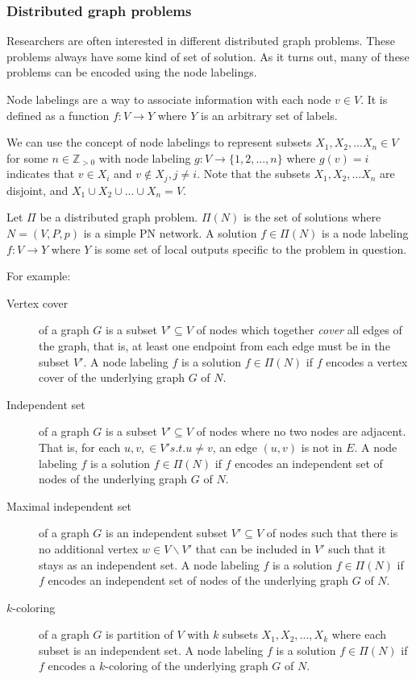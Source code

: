 \subsubsection{Distributed graph problems}
Researchers are often interested in different distributed graph problems.
These problems always have some kind of set of solution.
As it turns out, many of these problems can be encoded using the node labelings.

Node labelings are a way to associate information with each node $v \in V$.
It is defined as a function $f: V \rightarrow Y$ where $Y$ is an arbitrary set of labels.

We can use the concept of node labelings to represent subsets $X_1, X_2, ... X_n \in V$ for some $n \in \mathbb{Z}_{>0}$ with node labeling $g: V \rightarrow \{1, 2, ..., n\}$ where $g(v) = i$ indicates that $v \in X_i$ and $v \notin X_j, j \neq i$.
Note that the subsets $X_1, X_2, ... X_n$  are disjoint, and $X_1 \cup X_2 \cup ... \cup X_n = V$.

Let $\Pi$ be a distributed graph problem.
$\Pi(N)$ is the set of solutions where $N=(V, P, p)$ is a simple PN network.
A solution $f \in \Pi(N)$ is a node labeling $f: V \rightarrow Y$ where $Y$ is some set of local outputs specific to the problem in question.

For example:
\begin{description}
  \item[Vertex cover] of a graph $G$ is a subset $V' \subseteq V$ of nodes which together \emph{cover} all edges of the graph, that is, at least one endpoint from each edge must be in the subset $V'$.
  A node labeling $f$ is a solution $f \in \Pi(N)$ if $f$ encodes a vertex cover of the underlying graph $G$ of $N$.
  \item[Independent set] of a graph $G$ is a subset $V' \subseteq V$ of nodes where no two nodes are adjacent. That is, for each $u, v, \in V' s.t. u \neq v$, an edge $(u, v)$ is not in $E$.
  A node labeling $f$ is a solution $f \in \Pi(N)$ if $f$ encodes an independent set of nodes of the underlying graph $G$ of $N$.
  \item[Maximal independent set] of a graph $G$ is an independent subset $V' \subseteq V$ of nodes such that there is no additional vertex $w \in V \backslash V'$ that can be included in $V'$ such that it stays as an independent set.
  A node labeling $f$ is a solution $f \in \Pi(N)$ if $f$ encodes an independent set of nodes of the underlying graph $G$ of $N$.
  \item[$k$-coloring] of a graph $G$ is partition of $V$ with $k$ subsets $X_1, X_2, ..., X_k$ where each subset is an independent set.
  A node labeling $f$ is a solution $f \in \Pi(N)$ if $f$ encodes a $k$-coloring of the underlying graph $G$ of $N$.
\end{description}

